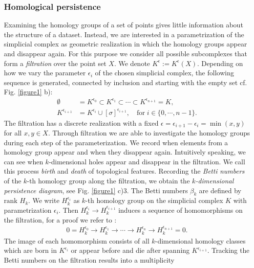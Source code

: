 \documentclass[runningheads,orivec]{llncs}
\begin{document}
\subsubsection{Homological persistence} Examining the homology groups of a set of points gives little information about the structure of a dataset. Instead, we are interested in a parametrization of the simplicial complex as geometric realization in which the homology groups appear and disappear again. For this purpose we consider all possible subcomplexes that form a \emph{filtration} over the point set $X$. We denote $K^{\epsilon} := K^{\epsilon}(X)$. Depending on how we vary the parameter $\epsilon_i$ of the chosen simplicial complex, the following sequence is generated, connected by inclusion and starting with the empty set cf. Fig. \ref{figure1} b):
\begin{align}
    \emptyset &= K^{\epsilon_0} \subset K^{\epsilon_1} \subset \cdots \subset K^{\epsilon_{n+1}}= K,\\
    K^{\epsilon_{i+1}} &= K^{\epsilon_i} \cup [\sigma]^{\epsilon_{i+1}}, \quad \text{for} \; i \in \{0, \cdots, n-1\}.
\end{align}
The filtration has a discrete realization with a fixed $\epsilon = \epsilon_{i+1}-\epsilon_{i} = \min(x,y)$ for all $x,y \in X$. Through filtration we are able to investigate the homology groups during each step of the parameterization. We record when elements from a homology group appear and when they disappear again. Intuitively speaking, we can see when $k$-dimensional holes appear and disappear in the filtration. We call this process \emph{birth} and \emph{death} of topological features. Recording the \emph{Betti numbers} of the $k$-th homology group along the filtration, we obtain the \emph{$k$-dimensional persistence diagram}, see Fig. \ref{figure1} c)3. The Betti numbers $\beta_k$ are defined by $\text{rank } H_k$. We write $H^{\epsilon_i}_k$ as $k$-th homology group on the simplicial complex $K$ with parametrization $\epsilon_i$. Then $H^{\epsilon_{i}}_{k} \rightarrow H^{\epsilon_{i+1}}_k$ induces a sequence of homomorphisms on the filtration, for a proof we refer to \cite{edelsbrunner2008persistent}:
\begin{align}
0 = H^{\epsilon_{0}}_k \rightarrow H^{\epsilon_{1}}_k \rightarrow \cdots \rightarrow H^{\epsilon_{n}}_k \rightarrow H^{\epsilon_{n+1}}_k = 0.
\end{align}
The image of each homomorphism consists of all $k$-dimensional homology classes which are born in $K^{\epsilon_i}$ or appear before and die after spanning $K^{\epsilon_{i+1}}$. Tracking the Betti numbers on the filtration results into a multiplicity
\end{document}
